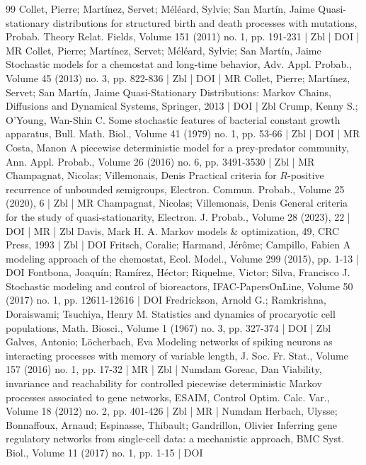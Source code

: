 \begin{thebibliography}{99}
 Collet, Pierre; Martínez, Servet; Méléard, Sylvie; San Martín, Jaime Quasi-stationary distributions for structured birth and death processes with mutations, Probab. Theory Relat. Fields, Volume 151 (2011) no. 1, pp. 191-231 | Zbl | DOI | MR
 Collet, Pierre; Martínez, Servet; Méléard, Sylvie; San Martín, Jaime Stochastic models for a chemostat and long-time behavior, Adv. Appl. Probab., Volume 45 (2013) no. 3, pp. 822-836 | Zbl | DOI | MR
 Collet, Pierre; Martínez, Servet; San Martín, Jaime Quasi-Stationary Distributions: Markov Chains, Diffusions and Dynamical Systems, Springer, 2013 | DOI | Zbl
 Crump, Kenny S.; O’Young, Wan-Shin C. Some stochastic features of bacterial constant growth apparatus, Bull. Math. Biol., Volume 41 (1979) no. 1, pp. 53-66 | Zbl | DOI | MR
 Costa, Manon A piecewise deterministic model for a prey-predator community, Ann. Appl. Probab., Volume 26 (2016) no. 6, pp. 3491-3530 | Zbl | MR
 Champagnat, Nicolas; Villemonais, Denis Practical criteria for ${R}$-positive recurrence of unbounded semigroups, Electron. Commun. Probab., Volume 25 (2020), 6 | Zbl | MR
 Champagnat, Nicolas; Villemonais, Denis General criteria for the study of quasi-stationarity, Electron. J. Probab., Volume 28 (2023), 22 | DOI | MR | Zbl
 Davis, Mark H. A. Markov models \& optimization, 49, CRC Press, 1993 | Zbl | DOI
 Fritsch, Coralie; Harmand, Jérôme; Campillo, Fabien A modeling approach of the chemostat, Ecol. Model., Volume 299 (2015), pp. 1-13 | DOI
 Fontbona, Joaquín; Ramírez, Héctor; Riquelme, Victor; Silva, Francisco J. Stochastic modeling and control of bioreactors, IFAC-PapersOnLine, Volume 50 (2017) no. 1, pp. 12611-12616 | DOI
 Fredrickson, Arnold G.; Ramkrishna, Doraiswami; Tsuchiya, Henry M. Statistics and dynamics of procaryotic cell populations, Math. Biosci., Volume 1 (1967) no. 3, pp. 327-374 | DOI | Zbl
 Galves, Antonio; Löcherbach, Eva Modeling networks of spiking neurons as interacting processes with memory of variable length, J. Soc. Fr. Stat., Volume 157 (2016) no. 1, pp. 17-32 | MR | Zbl | Numdam
 Goreac, Dan Viability, invariance and reachability for controlled piecewise deterministic Markov processes associated to gene networks, ESAIM, Control Optim. Calc. Var., Volume 18 (2012) no. 2, pp. 401-426 | Zbl | MR | Numdam
 Herbach, Ulysse; Bonnaffoux, Arnaud; Espinasse, Thibault; Gandrillon, Olivier Inferring gene regulatory networks from single-cell data: a mechanistic approach, BMC Syst. Biol., Volume 11 (2017) no. 1, pp. 1-15 | DOI

\end{thebibliography}
